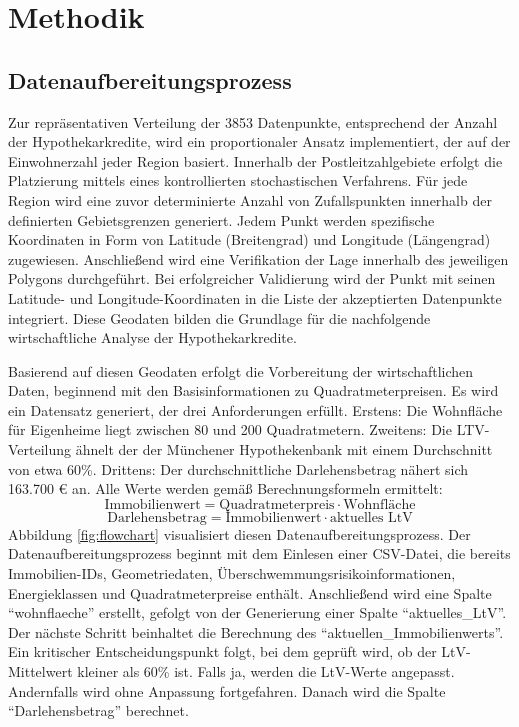 
\section{Methodik}\label{kap:4}
\subsection{Datenaufbereitungsprozess}
Zur repräsentativen Verteilung der 3853 Datenpunkte, entsprechend der Anzahl der Hypothekarkredite, wird ein proportionaler Ansatz implementiert, der auf der Einwohnerzahl jeder Region basiert. Innerhalb der Postleitzahlgebiete erfolgt die Platzierung mittels eines kontrollierten stochastischen Verfahrens. Für jede Region wird eine zuvor determinierte Anzahl von Zufallspunkten innerhalb der definierten Gebietsgrenzen generiert. Jedem Punkt werden spezifische Koordinaten in Form von Latitude (Breitengrad) und Longitude (Längengrad) zugewiesen. Anschließend wird eine Verifikation der Lage innerhalb des jeweiligen Polygons durchgeführt. Bei erfolgreicher Validierung wird der Punkt mit seinen Latitude- und Longitude-Koordinaten in die Liste der akzeptierten Datenpunkte integriert. Diese Geodaten bilden die Grundlage für die nachfolgende wirtschaftliche Analyse der Hypothekarkredite.

Basierend auf diesen Geodaten erfolgt die Vorbereitung der wirtschaftlichen Daten, beginnend mit den Basisinformationen zu Quadratmeterpreisen. Es wird ein Datensatz generiert, der drei Anforderungen erfüllt. Erstens: Die Wohnfläche für Eigenheime liegt zwischen 80 und 200 Quadratmetern. Zweitens: Die LTV-Verteilung ähnelt der der Münchener Hypothekenbank mit einem Durchschnitt von etwa 60\%. Drittens: Der durchschnittliche Darlehensbetrag nähert sich 163.700 € an. Alle Werte werden gemäß Berechnungsformeln ermittelt:
\begin{equation}
    \text{Immobilienwert} = \text{Quadratmeterpreis} \cdot \text{Wohnfläche}
\end{equation}
\begin{equation}
    \text{Darlehensbetrag} = \text{Immobilienwert} \cdot \text{aktuelles LtV}
\end{equation}
Abbildung \ref{fig:flowchart} visualisiert diesen Datenaufbereitungsprozess. Der Datenaufbereitungsprozess beginnt mit dem Einlesen einer CSV-Datei, die bereits Immobilien-IDs, Geometriedaten, Überschwemmungsrisikoinformationen, Energieklassen und Quadratmeterpreise enthält. Anschließend wird eine Spalte \enquote{wohnflaeche} erstellt, gefolgt von der Generierung einer Spalte \enquote{aktuelles\_LtV}. Der nächste Schritt beinhaltet die Berechnung des \enquote{aktuellen\_Immobilienwerts}. Ein kritischer Entscheidungspunkt folgt, bei dem geprüft wird, ob der LtV-Mittelwert kleiner als 60\% ist. Falls ja, werden die LtV-Werte angepasst. Andernfalls wird ohne Anpassung fortgefahren. Danach wird die Spalte \enquote{Darlehensbetrag} berechnet.

